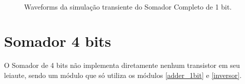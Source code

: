 \documentclass{iiufrgs}
\begin{document}
\begin{figure}[htbp]
    \centering
    \caption{Waveforms da simulação transiente do Somador Completo de 1 bit.}
    \label{fig:1bit_wave}
     \\
\end{figure}

\FloatBarrier


\section{Somador 4 bits}\label{adder_4bit}
O Somador de 4 bits não implementa diretamente nenhum transistor em seu leiaute, sendo um módulo que só utiliza os módulos \ref{adder_1bit} e \ref{inversor}.
\end{document}
